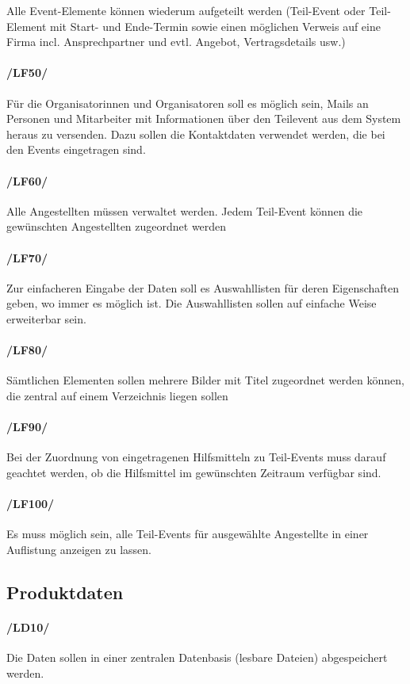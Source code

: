 Alle Event-Elemente können wiederum aufgeteilt werden (Teil-Event oder Teil-Element mit Start- und Ende-Termin sowie einen möglichen Verweis auf eine Firma incl. Ansprechpartner und evtl. Angebot, Vertragsdetails usw.)
\paragraph{/LF50/}
Für die Organisatorinnen und Organisatoren soll es möglich sein, Mails an Personen und Mitarbeiter mit Informationen über den Teilevent aus dem System heraus zu versenden. Dazu sollen die Kontaktdaten verwendet werden, die bei den Events eingetragen sind.
\paragraph{/LF60/}
Alle Angestellten müssen verwaltet werden. Jedem Teil-Event können die gewünschten Angestellten zugeordnet werden
\paragraph{/LF70/}
Zur einfacheren Eingabe der Daten soll es Auswahllisten für deren Eigenschaften geben, wo immer es möglich ist. Die Auswahllisten sollen auf einfache Weise erweiterbar sein.
\paragraph{/LF80/}
Sämtlichen Elementen sollen mehrere Bilder mit Titel zugeordnet werden können, die zentral auf einem Verzeichnis liegen sollen
\paragraph{/LF90/}
Bei der Zuordnung von eingetragenen Hilfsmitteln zu Teil-Events muss darauf geachtet werden, ob die Hilfsmittel im gewünschten Zeitraum verfügbar sind.
\paragraph{/LF100/}
Es muss möglich sein, alle Teil-Events für ausgewählte Angestellte in einer Auflistung anzeigen zu lassen.
\subsection{Produktdaten}
\paragraph{/LD10/}
Die Daten sollen in einer zentralen Datenbasis (lesbare Dateien) abgespeichert werden.
